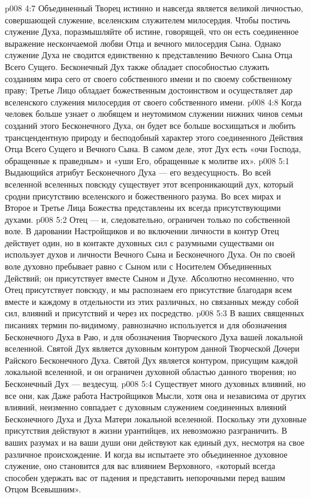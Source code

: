 \vs p008 4:7 \pc Объединенный Творец истинно и навсегда является великой личностью, совершающей служение, вселенским служителем милосердия. Чтобы постичь служение Духа, поразмышляйте об истине, говорящей, что он есть соединенное выражение нескончаемой любви Отца и вечного милосердия Сына. Однако служение Духа не сводится единственно к представлению Вечного Сына Отца Всего Сущего. Бесконечный Дух также обладает способностью служить созданиям мира сего от своего собственного имени и по своему собственному праву; Третье Лицо обладает божественным достоинством и осуществляет дар вселенского служения милосердия от своего собственного имени.
\vs p008 4:8 Когда человек больше узнает о любящем и неутомимом служении нижних чинов семьи созданий этого Бесконечного Духа, он будет все больше восхищаться и любить трансцендентную природу и бесподобный характер этого соединенного Действия Отца Всего Сущего и Вечного Сына. В самом деле, этот Дух есть «очи Господа, обращенные к праведным» и «уши Его, обращенные к молитве их».
\vs p008 5:1 Выдающийся атрибут Бесконечного Духа --- его вездесущность. Во всей вселенной вселенных повсюду существует этот всепроникающий дух, который сродни присутствию вселенского и божественного разума. Во всех мирах и Второе и Третье Лица Божества представлены их всегда присутствующими духами.
\vs p008 5:2 Отец ---  и, следовательно, ограничен только по собственной воле. В даровании Настройщиков и во включении личности в контур Отец действует один, но в контакте духовных сил с разумными существами он использует духов и личности Вечного Сына и Бесконечного Духа. Он по своей воле духовно пребывает равно с Сыном или с Носителем Объединенных Действий; он присутствует вместе  Сыном и  Духе. Абсолютно несомненно, что Отец присутствует повсюду, и мы распознаем его присутствие благодаря всем вместе и каждому в отдельности из этих различных, но связанных между собой сил, влияний и присутствий и через их посредство.
\vs p008 5:3 \pc В ваших священных писаниях термин  по\hyp{}видимому, равнозначно используется и для обозначения Бесконечного Духа в Раю, и для обозначения Творческого Духа вашей локальной вселенной. Святой Дух является духовным контуром данной Творческой Дочери Райского Бесконечного Духа. Святой Дух является контуром, присущим каждой локальной вселенной, и он ограничен духовной областью данного творения; но Бесконечный Дух --- вездесущ.
\vs p008 5:4 \pc Существует много духовных влияний, но все они, как  Даже работа Настройщиков Мысли, хотя она и независима от других влияний, неизменно совпадает с духовным служением соединенных влияний Бесконечного Духа и Духа Матери локальной вселенной. Поскольку эти духовные присутствия действуют в жизни урантийцев, их невозможно разграничить. В ваших разумах и на ваши души они действуют как единый дух, несмотря на свое различное происхождение. И когда вы испытаете это объединенное духовное служение, оно становится для вас влиянием Верховного, «который всегда способен удержать вас от падения и представить непорочными перед вашим Отцом Всевышним».

